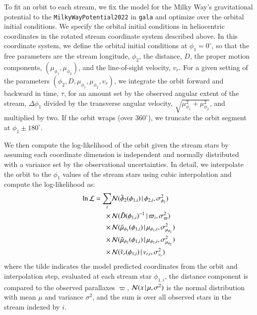 \documentclass[final,5p,times,twocolumn,authoryear]{elsarticle}
\begin{document}
To fit an orbit to each stream, we fix the model for the Milky Way's gravitational
potential to the \texttt{MilkyWayPotential2022} in \texttt{gala} \citep{gala} and
optimize over the orbital initial conditions.
We specify the orbital initial conditions in heliocentric coordinates in the rotated
stream coordinate system described above.
In this coordinate system, we define the orbital initial conditions at $\phi_1=0^\circ$,
so that the free parameters are the stream longitude, $\phi_2$, the distance, $D$, the
proper motion components, $(\mu_{\phi_1}, \mu_{\phi_2})$, and the line-of-sight
velocity, $v_r$.
For a given setting of the parameters $(\phi_2, D, \mu_{\phi_1}, \mu_{\phi_2}, v_r)$, we
integrate the orbit forward and backward in time, $\tau$, for an amount set by the
observed angular extent of the stream, $\Delta \phi_1$ divided by the transverse angular
velocity, $\sqrt{\mu_{\phi_1}^2 + \mu_{\phi_2}^2}$, and multiplied by two.
If the orbit wraps (over $360^\circ$), we truncate the orbit segment at $\phi_1 \pm
180^\circ$.

We then compute the log-likelihood of the orbit given the stream stars by assuming each
coordinate dimension is independent and normally distributed with a variance set by the
observational uncertainties.
In detail, we interpolate the orbit to the $\phi_1$ values of the stream stars using
cubic interpolation and compute the log-likelihood as:
\begin{equation}
\begin{split}
    \ln \mathcal{L} = \sum_i
    &\mathcal{N}(\tilde{\phi}_2(\phi_{1, i}) \,|\, \phi_{2, i}, \sigma_{\phi_{2}}^2) \\
    \times \, &\mathcal{N}(\tilde{D}(\phi_{1, i})^{-1} \,|\, \varpi_{i}, \sigma_{\varpi}^2) \\
    \times \, &\mathcal{N}(\tilde{\mu}_{\phi_1}(\phi_{1, i}) \,|\, \mu_{\phi_1, i}, \sigma_{\mu_{\phi_1}}^2) \\
    \times \, &\mathcal{N}(\tilde{\mu}_{\phi_2}(\phi_{1, i}) \,|\, \mu_{\phi_2, i}, \sigma_{\mu_{\phi_2}}^2) \\
    \times \, &\mathcal{N}(\tilde{v}_r(\phi_{1, i}) \,|\, v_{r, i}, \sigma_{v_r}^2)
\end{split}
\end{equation}
where the tilde indicates the model predicted coordinates from the orbit and
interpolation step, evaluated at each stream star $\phi_{1, i}$, the distance component
is compared to the observed parallaxes $\varpi$, $\mathcal{N}(x \,|\, \mu, \sigma^2)$
is the normal distribution with mean $\mu$ and variance $\sigma^2$, and the sum is over
all observed stars in the stream indexed by $i$.
\end{document}
